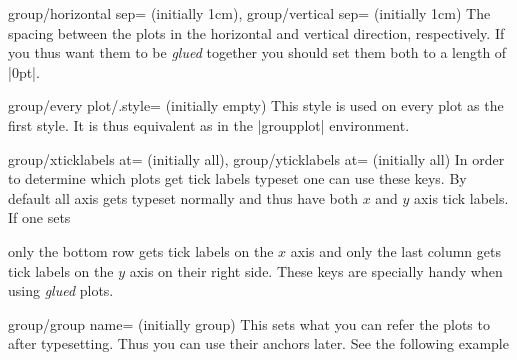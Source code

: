 \begin{pgfplotskeylist}{group/horizontal sep= (initially 1cm),
      group/vertical sep= (initially 1cm)}
  The spacing between the plots in the horizontal and vertical direction, respectively. If you thus want them to be \textit{glued} together you should set
  them both to a length of |0pt|.
\end{pgfplotskeylist}

\begin{pgfplotskey}{group/every plot/.style= (initially empty)}
      This style is used on every plot as the first style. It is thus equivalent as  in the |groupplot| environment.
\end{pgfplotskey}

\begin{pgfplotskeylist}{group/xticklabels at= (initially all),%
      group/yticklabels at= (initially all)}
  In order to determine which plots get tick labels typeset one can use these keys. By default all axis gets typeset normally and thus have both $x$ and
  $y$ axis tick labels. If one sets

\begin{codeexample}
\pgfplotsset{group/xticklabels at=edge bottom,group/yticklabels at=edge right}
\end{codeexample}
only the bottom row gets tick labels on the $x$ axis and only the last column gets tick labels on the $y$ axis on their right side. These keys are
specially handy when using \textit{glued} plots.
\end{pgfplotskeylist}

\begin{pgfplotskey}{group/group name= (initially group)}
  This sets what you can refer the plots to after typesetting. Thus you can use their anchors later. See the following example
\begin{codeexample}[]
\end{codeexample}
\end{pgfplotskey}

